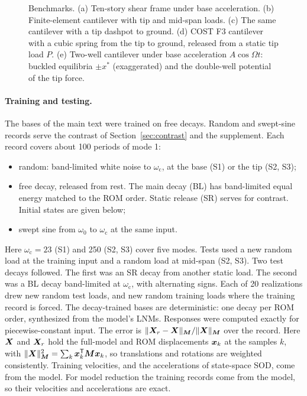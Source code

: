 \documentclass[preprint,12pt]{elsarticle}
\begin{document}
\begin{figure}[tbp]
\centering

\caption{Benchmarks. (a) Ten-story shear frame under base acceleration. (b) Finite-element cantilever with tip and mid-span loads. (c) The same cantilever with a tip dashpot to ground. (d) COST F3 cantilever with a cubic spring from the tip to ground, released from a static tip load $P$. (e) Two-well cantilever under base acceleration $A\cos\varOmega t$: buckled equilibria $\pm x^*$ (exaggerated) and the double-well potential of the tip force.}
\label{fig:systems}
\end{figure}

\paragraph{Training and testing.} The bases of the main text were trained on free decays. Random and swept-sine records serve the contrast of Section~\ref{sec:contrast} and the supplement. Each record covers about 100 periods of mode 1:
\begin{itemize}
\item random: band-limited white noise to $\omega_{\mathrm c}$, at the base (S1) or the tip (S2, S3);
\item free decay, released from rest. The main decay (BL) has band-limited equal energy matched to the ROM order. Static release (SR) serves for contrast. Initial states are given below;
\item swept sine from $\omega_0$ to $\omega_{\mathrm c}$ at the same input.
\end{itemize}
Here $\omega_{\mathrm c}=23$ (S1) and 250 (S2, S3) cover five modes.
Tests used a new random load at the training input and a random load at mid-span (S2, S3). Two test decays followed. The first was an SR decay from another static load. The second was a BL decay band-limited at $\omega_{\mathrm c}$, with alternating signs.
Each of 20 realizations drew new random test loads, and new random training loads where the training record is forced. The decay-trained bases are deterministic: one decay per ROM order, synthesized from the model's LNMs.
Responses were computed exactly for piecewise-constant input.
The error is $\|\bm{X}_r-\bm{X}\|_{\bm{M}}/\|\bm{X}\|_{\bm{M}}$ over the record. Here $\bm{X}$ and $\bm{X}_r$ hold the full-model and ROM displacements $\bm{x}_k$ at the samples $k$, with $\|\bm{X}\|_{\bm{M}}^2=\sum_k\bm{x}_k^{\mathsf T}\bm{M}\bm{x}_k$, so translations and rotations are weighted consistently.
Training velocities, and the accelerations of state-space SOD, come from the model. For model reduction the training records come from the model, so their velocities and accelerations are exact.
\end{document}
